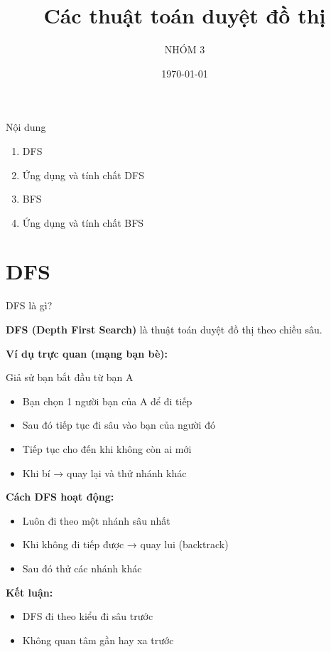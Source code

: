 \documentclass{beamer}
\title{Các thuật toán duyệt đồ thị}
\author{NHÓM 3}
\date{\today}
\newcommand{\hlblue}[1]{\textcolor{myblue}{#1}}
\newcommand{\hlgreen}[1]{\textcolor{mygreen}{#1}}
\newcommand{\hlred}[1]{\textcolor{myred}{#1}}
\newcommand{\hlorange}[1]{\textcolor{myorange}{#1}}
\begin{document}
\frame{\titlepage}

\begin{frame}{Nội dung}
\begin{enumerate}
\item DFS
\item Ứng dụng và tính chất DFS
\item BFS
\item Ứng dụng và tính chất BFS
\end{enumerate}
\end{frame}

\section{DFS}

\begin{frame}{DFS là gì?}

\textbf{DFS (Depth First Search)} là thuật toán duyệt đồ thị theo \hlblue{chiều sâu}.

\vspace{6pt}

\textbf{Ví dụ trực quan (mạng bạn bè):}

Giả sử bạn bắt đầu từ \hlred{bạn A}

\begin{itemize}
\item Bạn chọn 1 người bạn của A để đi tiếp
\item Sau đó tiếp tục đi sâu vào bạn của người đó
\item Tiếp tục cho đến khi không còn ai mới
\item Khi bí → quay lại và thử nhánh khác
\end{itemize}

\vspace{6pt}

\textbf{Cách DFS hoạt động:}
\begin{itemize}
\item Luôn đi theo \hlgreen{một nhánh sâu nhất}
\item Khi không đi tiếp được → \hlorange{quay lui (backtrack)}
\item Sau đó thử các nhánh khác
\end{itemize}

\vspace{6pt}

\textbf{Kết luận:}
\begin{itemize}
\item DFS đi theo kiểu \hlred{đi sâu trước}
\item Không quan tâm gần hay xa trước
\end{itemize}

\end{frame}
\end{document}
